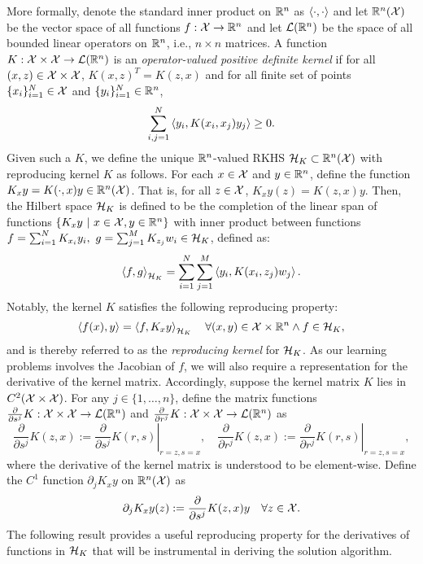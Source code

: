 More formally, denote the standard inner product on $\mathbb{R}^n$ as $\left\langle \cdot, \cdot \right\rangle$ and let $\mathbb{R}^n(\mathcal{X})$ be the vector space of all functions $f : \mathcal{X} \rightarrow \mathbb{R}^n$ and let $\mathcal{L}(\mathbb{R}^n)$ be the space of all bounded linear operators on $\mathbb{R}^n$, i.e., $n\times n$ matrices. A function $K : \mathcal{X} \times \mathcal{X} \rightarrow \mathcal{L}(\mathbb{R}^n)$ is an \emph{operator-valued positive definite kernel} if for all $(x,z) \in \mathcal{X} \times \mathcal{X}$, $K(x,z)^T = K(z,x)$ and for all finite set of points $\{x_i\}_{i=1}^{N} \in \mathcal{X}$ and $\{y_i\}_{i=1}^{N} \in \mathbb{R}^n$, 
\[
	\sum_{i,j=1}^{N} \left\langle y_i, K(x_i,x_j)y_j \right\rangle \geq 0.
\]
Given such a $K$, we define the unique $\mathbb{R}^n$-valued RKHS $\mathcal{H}_{K} \subset \mathbb{R}^n(\mathcal{X})$ with reproducing kernel $K$ as follows. For each $x \in \mathcal{X}$ and $y\in \mathbb{R}^n$, define the function $K_{x} y = K(\cdot, x) y \in \mathbb{R}^n(\mathcal{X})$. That is, for all $z \in \mathcal{X}$, $K_x y (z) = K(z,x) y$. Then, the Hilbert space $\mathcal{H}_{K}$ is defined to be the completion of the linear span of functions $\{K_x y \ | \ x \in \mathcal{X}, y \in \mathbb{R}^n\}$ with inner product between functions $f  = \sum_{i=1}^{N} K_{x_i} y_i,\ g = \sum_{j=1}^{M} K_{z_j} w_i \in \mathcal{H}_{K}$, defined as:
\[
	\left\langle f, g \right\rangle_{\mathcal{H}_{K}} = \sum_{i=1}^{N}\sum_{j=1}^{M} \left\langle y_i, K(x_i,z_j) w_j \right\rangle.
\] 
Notably, the kernel $K$ satisfies the following reproducing property:
\begin{equation}
	\left\langle f(x), y \right\rangle = \left\langle f, K_x y \right\rangle_{\mathcal{H}_{K}} \quad \forall (x,y) \in \mathcal{X} \times \mathbb{R}^n \wedge f \in \mathcal{H}_{K},
\label{RK_rep}
\end{equation}
and is thereby referred to as the \emph{reproducing kernel} for $\mathcal{H}_{K}$. As our learning problems involves the Jacobian of $f$, we will also require a representation for the derivative of the kernel matrix. Accordingly, suppose the kernel matrix $K$ lies in $C^{2}(\mathcal{X} \times \mathcal{X})$. For any $j \in \{1,\ldots, n\}$, define the matrix functions $\frac{\partial}{\partial s^j} K: \mathcal{X} \times \mathcal{X} \rightarrow \mathcal{L}(\mathbb{R}^n)$ and $\frac{\partial}{\partial r^j} K : \mathcal{X} \times \mathcal{X} \rightarrow \mathcal{L}(\mathbb{R}^n)$ as
\[
	\dfrac{\partial}{\partial s^j} K(z,x) := \left.\dfrac{\partial}{\partial s^j} K(r , s) \right|_{r = z, s = x}  , \quad \dfrac{\partial}{\partial r^j} K(z,x) := \left. \dfrac{\partial}{\partial r^j} K(r,s) \right|_{r = z,s=x},
\]
where the derivative of the kernel matrix is understood to be element-wise. 
Define the $C^1$ function $\partial_j K_x y$ on $\mathbb{R}^n(\mathcal{X})$ as
\[
	\partial_j K_x y(z) := \dfrac{\partial}{\partial s^j} K(z, x)y \quad \forall z \in \mathcal{X}.
\]
The following result provides a useful reproducing property for the derivatives of functions in $\mathcal{H}_{K}$ that will be instrumental in deriving the solution algorithm.


